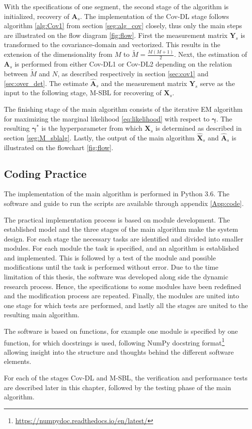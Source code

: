 With the specifications of one segment, the second stage of the algorithm is initialized, recovery of $\mathbf{A}_s$.
The implementation of the Cov-DL stage follows algorithm \ref{alg:Cov1} from section \ref{seg:alg_cov} closely, thus only the main steps are illustrated on the flow diagram \ref{fig:flow}.
First the measurement matrix $\mathbf{Y}_s$ is transformed to the covariance-domain and vectorized. This results in the extension of the dimensionality from $M$ to $\widetilde{M} = \frac{M(M+1)}{2}$.
Next, the estimation of $\mathbf{A}_s$ is performed from either Cov-DL1 or Cov-DL2 depending on the relation between $\widetilde{M}$ and $N$, as described respectively in section \ref{sec:cov1} and \ref{sec:over_det}.
The estimate $\hat{\mathbf{A}}_s$ and the measurement matrix $\mathbf{Y}_s$ serve as the input to the following stage, M-SBL for recovering of $\mathbf{X}_s$. 

The finishing stage of the main algorithm consists of the iterative EM algorithm for maximizing the marginal likelihood \eqref{eq:likelihood} with respect to $\boldsymbol{\gamma}$. The resulting $\boldsymbol{\gamma}^{\ast}$ is the hyperparameter from which $\mathbf{X}_s$ is determined as described in section \ref{seg:M_sblalg}. 
Lastly, the output of the main algorithm $\hat{\mathbf{X}}_s$ and $\hat{\mathbf{A}}_s$ is illustrated on the flowchart \ref{fig:flow}.

\subsection{Coding Practice}
The implementation of the main algorithm is performed in Python 3.6. The software and guide to run the scripts are available through appendix \ref{App:code}.

The practical implementation process is based on module development. 
The established model and the three stages of the main algorithm make the system design. 
For each stage the necessary tasks are identified and divided into smaller modules. 
For each module the task is specified, and an algorithm is established and implemented. 
This is followed by a test of the module and possible modifications until the task is performed without error. 
Due to the time limitation of this thesis, the software was developed along side the dynamic research process. 
Hence, the specifications to some modules have been redefined and the modification process are repeated. 
Finally, the modules are united into one stage for which tests are performed, and lastly all the stages are united to the resulting main algorithm.

The software is based on functions, for example one module is specified by one function, for which docstrings is used, following NumPy docstring format\footnote{\url{https://numpydoc.readthedocs.io/en/latest/}} allowing insight into the structure and thoughts behind the different software elements.

For each of the stages Cov-DL and M-SBL,  the verification and performance tests are described later in this chapter, followed by the testing phase of the main algorithm. 
